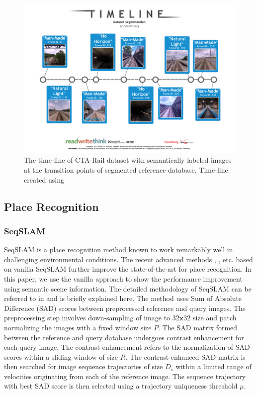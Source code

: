 \documentclass[letterpaper, 10 pt, conference]{ieeeconf}  %
\begin{document}
\begin{figure}[!htbp]
 \includegraphics[clip, trim=2cm 4cm 2cm 4cm,scale=0.35]{cta-dataset-segmentation-1}
 \caption{The time-line of CTA-Rail dataset with semantically labeled images at the transition points of segmented reference database. Time-line created using \cite{timelineRWT}}
 \label{fig:datasetLabels}
\end{figure}

\subsection{Place Recognition}
\subsubsection{SeqSLAM}
SeqSLAM \cite{Milford2012} is a place recognition method known to work remarkably well in challenging environmental conditions. The recent advanced methods \cite{milford2015sequence}, \cite{wang2015improved}, \cite{milford2015place} etc. based on vanilla SeqSLAM further improve the state-of-the-art for place recognition. In this paper, we use the vanilla approach to show the performance improvement using semantic scene information. The detailed methodology of SeqSLAM can be referred to in \cite{Milford2012} and is briefly explained here. The method uses Sum of Absolute Difference (SAD) scores between preprocessed reference and query images. The preprocessing step involves down-sampling of image to $32\mathbf{x}32$ size and patch normalizing the images with a fixed window size $P$. The SAD matrix formed between the reference and query database undergoes contrast enhancement for each query image. The contrast enhancement refers to the normalization of SAD scores within a sliding window of size $R$. The contrast enhanced SAD matrix is then searched for image sequence trajectories of size $D_s$ within a limited range of velocities originating from each of the reference image. The sequence trajectory with best SAD score is then selected using a trajectory uniqueness threshold $\mu$.
\end{document}
